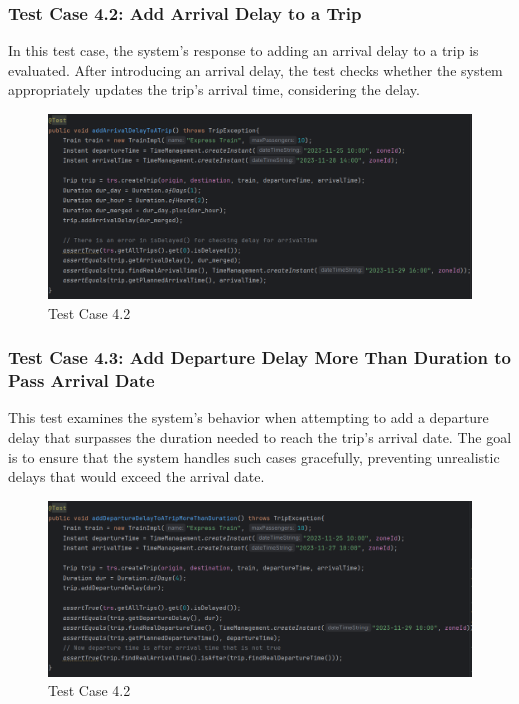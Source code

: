 \documentclass{article}
\begin{document}
\pagebreak

\subsubsection{Test Case 4.2: Add Arrival Delay to a Trip}

In this test case, the system's response to adding an arrival delay to a trip is evaluated. After introducing an arrival delay, the test checks whether the system appropriately updates the trip's arrival time, considering the delay.

\begin{figure}[h]
  \centering
  \includegraphics[width=1.0\textwidth]{pictures/T4-2.png}
  \caption{Test Case 4.2}
  \label{fig:your_label}
\end{figure}

\pagebreak

\subsubsection{Test Case 4.3: Add Departure Delay More Than Duration to Pass Arrival Date}

This test examines the system's behavior when attempting to add a departure delay that surpasses the duration needed to reach the trip's arrival date. The goal is to ensure that the system handles such cases gracefully, preventing unrealistic delays that would exceed the arrival date.

\begin{figure}[h]
  \centering
  \includegraphics[width=1.0\textwidth]{pictures/T4-3.png}
  \caption{Test Case 4.2}
  \label{fig:your_label}
\end{figure}
\end{document}

